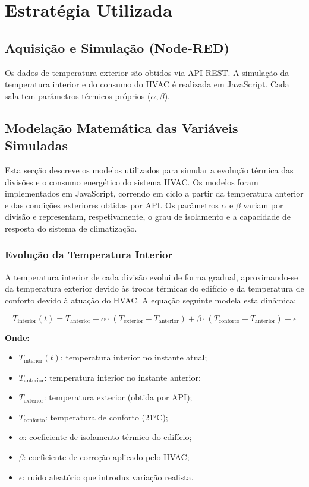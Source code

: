 \documentclass[a4paper, 12pt]{article} %
\begin{document}
\newpage
\section{Estratégia Utilizada}

\subsection{Aquisição e Simulação (Node-RED)}

Os dados de temperatura exterior são obtidos via API REST.  
A simulação da temperatura interior e do consumo do HVAC é realizada em JavaScript.
Cada sala tem parâmetros térmicos próprios (\(\alpha, \beta\)).
\subsection{Modelação Matemática das Variáveis Simuladas}

Esta secção descreve os modelos utilizados para simular a evolução térmica das divisões e o consumo energético do sistema HVAC.  
Os modelos foram implementados em JavaScript, correndo em ciclo a partir da temperatura anterior e das condições exteriores obtidas por API.  
Os parâmetros $\alpha$ e $\beta$ variam por divisão e representam, respetivamente, o grau de isolamento e a capacidade de resposta do sistema de climatização.

\subsubsection*{Evolução da Temperatura Interior}

A temperatura interior de cada divisão evolui de forma gradual, aproximando-se da temperatura exterior devido às trocas térmicas do edifício e da temperatura de conforto devido à atuação do HVAC.
A equação seguinte modela esta dinâmica:

\[
T_{\text{interior}}(t) = T_{\text{anterior}} + \alpha \cdot (T_{\text{exterior}} - T_{\text{anterior}}) + \beta \cdot (T_{\text{conforto}} - T_{\text{anterior}}) + \epsilon
\]

\textbf{Onde:}
\begin{itemize}[nosep]
	\item $T_{\text{interior}}(t)$: temperatura interior no instante atual;
	\item $T_{\text{anterior}}$: temperatura interior no instante anterior;
	\item $T_{\text{exterior}}$: temperatura exterior (obtida por API);
	\item $T_{\text{conforto}}$: temperatura de conforto (21°C);
	\item $\alpha$: coeficiente de isolamento térmico do edifício;
	\item $\beta$: coeficiente de correção aplicado pelo HVAC;
	\item $\epsilon$: ruído aleatório que introduz variação realista.\\
\end{itemize}
\end{document}

